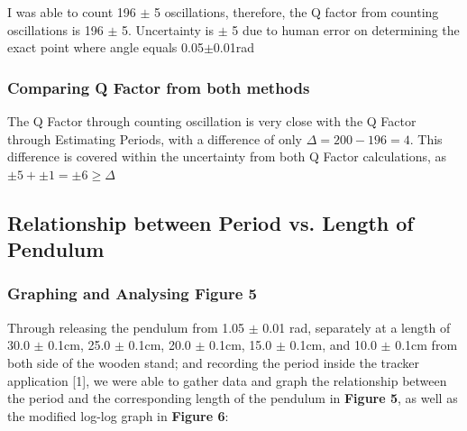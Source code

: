 \documentclass{article}
\begin{document}
\noindent I was able to count 196 $\pm$ 5 oscillations, therefore, the Q factor from counting oscillations is 196 $\pm$ 5. Uncertainty is $\pm$ 5 due to human error on determining the exact point where angle equals 0.05$\pm$0.01rad

\subsubsection{Comparing Q Factor from both methods}

The Q Factor through counting oscillation is very close with the Q Factor through Estimating Periods, with a difference of only $\Delta = 200-196=4$. This difference is covered within the uncertainty from both Q Factor calculations, as $\pm 5 + \pm 1 = \pm 6 \geqslant \Delta $


\subsection{Relationship between Period vs. Length of Pendulum}
\subsubsection{Graphing and Analysing Figure 5}
Through releasing the pendulum from 1.05 $\pm$ 0.01 rad, separately at a length of  30.0 $\pm$ 0.1cm,  25.0 $\pm$ 0.1cm, 20.0 $\pm$ 0.1cm, 15.0 $\pm$ 0.1cm, and 10.0 $\pm$ 0.1cm  from both side of the wooden stand; and recording the period inside the tracker application [1], we were able to gather data and graph the relationship between the period and the corresponding length of the pendulum in \textbf{Figure 5}, as well as the modified log-log graph in \textbf{Figure 6}:
\end{document}
